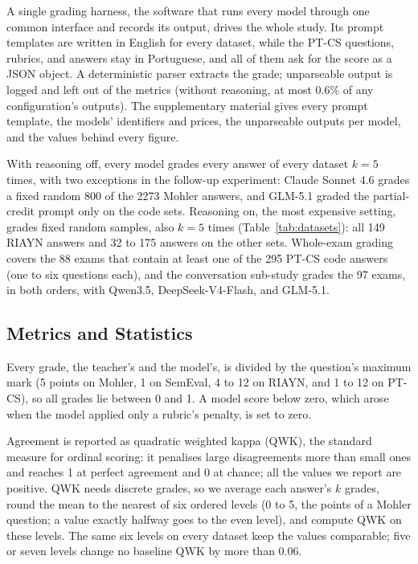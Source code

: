 A single grading harness, the software that runs every model through one common interface and records its
output, drives the whole study. Its prompt templates are written in English for every dataset, while the PT-CS
questions, rubrics, and answers stay in Portuguese, and all of them ask for the score as a JSON object. A
deterministic parser extracts the grade; unparseable output is logged and left out of the metrics (without
reasoning, at most 0.6\% of any configuration's outputs). The supplementary material gives every prompt
template, the models' identifiers and prices, the unparseable outputs per model, and the values behind every
figure.

With reasoning off, every model grades every answer of every dataset $k=5$ times, with two exceptions in the
follow-up experiment: Claude Sonnet 4.6 grades a fixed random 800 of the 2273 Mohler answers, and GLM-5.1 graded
the partial-credit prompt only on the code sets. Reasoning on, the most expensive setting, grades fixed random
samples, also $k=5$ times (Table~\ref{tab:datasets}): all 149 RIAYN answers and 32 to 175 answers on the other sets. Whole-exam
grading covers the 88 exams that contain at least one of the 295 PT-CS code answers (one to six questions each),
and the conversation sub-study grades the 97 exams, in both orders, with Qwen3.5, DeepSeek-V4-Flash, and
GLM-5.1.

\subsection{Metrics and Statistics}
\label{sec:metrics}

Every grade, the teacher's and the model's, is divided by the question's maximum mark (5 points on Mohler, 1 on
SemEval, 4 to 12 on RIAYN, and 1 to 12 on PT-CS), so all grades lie between 0 and 1. A model score below zero,
which arose when the model applied only a rubric's penalty, is set to zero.

Agreement is reported as quadratic weighted kappa (QWK), the standard measure for ordinal scoring: it penalises
large disagreements more than small ones and reaches 1 at perfect agreement and 0 at chance; all the values we
report are positive. QWK needs discrete grades, so we average each answer's $k$ grades, round the mean to the
nearest of six ordered levels (0 to 5, the points of a Mohler question; a value exactly halfway goes to the even
level), and compute QWK on these levels. The same six levels on every dataset keep the values comparable; five
or seven levels change no baseline QWK by more than 0.06.

